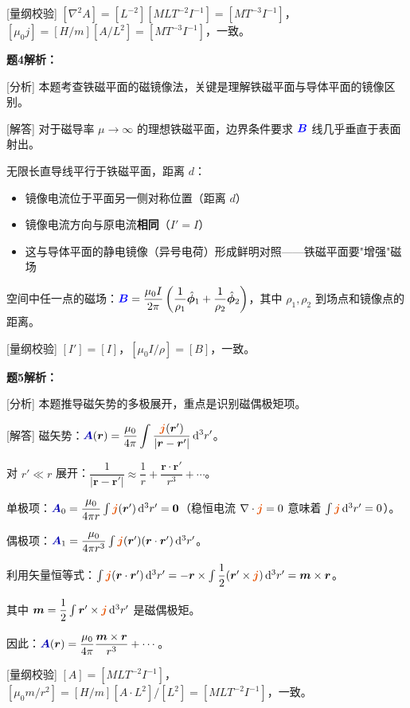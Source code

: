 \documentclass[11pt,a4paper,openany,oneside]{book}
\newcommand{\diff}{\mathrm{d}}
\newcommand{\vecB}{\textcolor{blue}{\vect{B}}}
\newcommand{\vecJ}{\textcolor{cororange}{\vect{j}}}
\newcommand{\vecA}{\textcolor{blue!70!black}{\vect{A}}}
\newcommand{\muz}{\mu_0}
\newcommand{\vect}[1]{\bm{#1}}
\newcommand{\unitvec}[1]{\hat{\vect{#1}}}
\newcommand{\divg}{\nabla\cdot}
\newcommand{\lap}{\nabla^2}
\begin{document}
[量纲校验] $[\lap A] = [L^{-2}][MLT^{-2}I^{-1}] = [MT^{-3}I^{-1}]$，$[\muz j] = [H/m][A/L^2] = [MT^{-3}I^{-1}]$，一致。\qedsymbol

\textbf{题4解析：}

[分析] 本题考查铁磁平面的磁镜像法，关键是理解铁磁平面与导体平面的镜像区别。

[解答] 对于磁导率 $\mu \to \infty$ 的理想铁磁平面，边界条件要求 $\vecB$ 线几乎垂直于表面射出。

无限长直导线平行于铁磁平面，距离 $d$：
\begin{itemize}
\item 镜像电流位于平面另一侧对称位置（距离 $d$）
\item 镜像电流方向与原电流\textbf{相同}（$I' = I$）
\item 这与导体平面的静电镜像（异号电荷）形成鲜明对照——铁磁平面要"增强"磁场
\end{itemize}

空间中任一点的磁场：$\vecB = \dfrac{\muz I}{2\pi}\left(\dfrac{1}{\rho_1}\unitvec{\phi}_1 + \dfrac{1}{\rho_2}\unitvec{\phi}_2\right)$，其中 $\rho_1, \rho_2$ 到场点和镜像点的距离。\qedsymbol

[量纲校验] $[I'] = [I]$，$[\muz I/\rho] = [B]$，一致。\qedsymbol

\textbf{题5解析：}

[分析] 本题推导磁矢势的多极展开，重点是识别磁偶极矩项。

[解答] 磁矢势：$\vecA(\vect{r}) = \dfrac{\muz}{4\pi}\displaystyle\int\dfrac{\vecJ(\vect{r}')}{|\vect{r} - \vect{r}'|}\,\diff^3r'$。

对 $r' \ll r$ 展开：$\dfrac{1}{|\vect{r} - \vect{r}'|} \approx \dfrac{1}{r} + \dfrac{\vect{r}\cdot\vect{r}'}{r^3} + \cdots$。

单极项：$\vecA_0 = \dfrac{\muz}{4\pi r}\int\vecJ(\vect{r}')\,\diff^3r' = \vect{0}$（稳恒电流 $\divg\vecJ = 0$ 意味着 $\int\vecJ\,\diff^3r' = 0$）。

偶极项：$\vecA_1 = \dfrac{\muz}{4\pi r^3}\int\vecJ(\vect{r}')(\vect{r}\cdot\vect{r}')\,\diff^3r'$。

利用矢量恒等式：$\int\vecJ(\vect{r}\cdot\vect{r}')\,\diff^3r' = -\vect{r}\times\int\dfrac{1}{2}(\vect{r}'\times\vecJ)\,\diff^3r' = \vect{m}\times\vect{r}$。

其中 $\vect{m} = \dfrac{1}{2}\int\vect{r}'\times\vecJ\,\diff^3r'$ 是磁偶极矩。

因此：$\vecA(\vect{r}) = \dfrac{\muz}{4\pi}\dfrac{\vect{m}\times\vect{r}}{r^3} + \cdots$。\qedsymbol

[量纲校验] $[A] = [MLT^{-2}I^{-1}]$，$[\muz m/r^2] = [H/m][A\cdot L^2]/[L^2] = [MLT^{-2}I^{-1}]$，一致。\qedsymbol
\end{document}
